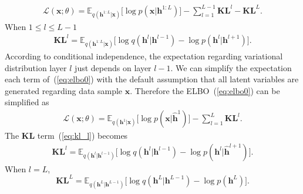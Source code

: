 \documentclass[sigconf, anonymous, review]{acmart}
\theoremstyle{plain}
\theoremstyle{definition}
\theoremstyle{remark}
\begin{document}
 \begin{align} \label{eq:elbo0}
\mathcal{L}(\mathbf{x}; \theta) = \mathbb{E}_{q(\mathbf{h}^{1:L}|\mathbf{x})}\big[ \log p(\mathbf{x}|\mathbf{h}^{1:L})  \big] - \sum_{l=1}^{L-1} \mathbf{KL}^l -\mathbf{KL}^L.
\end{align}
When $1\leqslant l \leqslant L-1$
 \begin{align} \label{eq:kl_l}
 \mathbf{KL}^l=\mathbb{E}_{q(\mathbf{h}^{1:L}|\mathbf{x})}\big[  \log q(\mathbf{h}^{l}|\mathbf{h}^{l-1})   - \log p(\mathbf{h}^{l}|\mathbf{h}^{l+1}) \big].
 \end{align}%
According to conditional independence, the expectation regarding variational distribution layer $l$ just depends on layer $l-1$. We can simplify the expectation each term of~(\ref{eq:elbo0}) with the default assumption that all latent variables are generated regarding data sample $\mathbf{x}$.  Therefore the ELBO~(\ref{eq:elbo0}) can be simplified as 
 {\small
 \begin{align} \label{eq:elbo1}
\mathcal{L}(\mathbf{x}; \theta) = \mathbb{E}_{q(\mathbf{h}^{1}|\mathbf{x})}\big[ \log p(\mathbf{x}|\widehat{\mathbf{h}}^{1})  \big] - \sum_{l=1}^{L} \mathbf{KL}^l.
\end{align}}
The $\mathbf{KL}$
term~(\ref{eq:kl_l}) becomes
 {\small
\begin{align*}
 \mathbf{KL}^l=\mathbb{E}_{q(\mathbf{h}^{l}|\mathbf{h}^{l-1})}\big[  \log q(\mathbf{h}^{l}|\mathbf{h}^{l-1})   - \log p(\mathbf{h}^{l}|\widehat{\mathbf{h}}^{l+1}) \big].
 \end{align*}}
When $l=L$, 
 {\small$$\mathbf{KL}^L =  \mathbb{E}_{q(\mathbf{h}^{L}|\mathbf{h}^{L-1})}\big[  \log q(\mathbf{h}^{L}|\mathbf{h}^{L-1})- \log p(\mathbf{h}^{L})  \big].$$}

\end{document}
